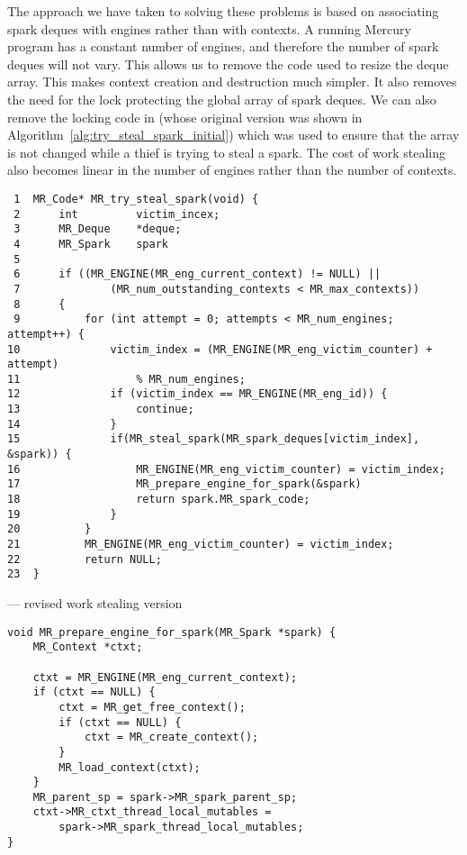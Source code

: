 The approach we have taken to solving these problems is based on associating
spark deques with engines rather than with contexts.
A running Mercury program has a constant number of engines,
and therefore the number of spark deques will not vary.
This allows us to remove the code used to resize the deque array.
This makes context creation and destruction much simpler.
It also removes the need for the lock protecting the global array of spark
deques.
We can also remove the locking code in \trystealspark
(whose original version was shown in
Algorithm~\ref{alg:try_steal_spark_initial})
which was used to
ensure that the array is not changed while a thief is trying to steal a
spark.
The cost of work stealing also becomes linear in the number of engines
rather than the number of contexts.

\begin{algorithm}[tbp]
\begin{verbatim}
 1  MR_Code* MR_try_steal_spark(void) {
 2      int         victim_incex;
 3      MR_Deque    *deque;
 4      MR_Spark    spark
 5
 6      if ((MR_ENGINE(MR_eng_current_context) != NULL) ||
 7              (MR_num_outstanding_contexts < MR_max_contexts))
 8      {
 9          for (int attempt = 0; attempts < MR_num_engines; attempt++) {
10              victim_index = (MR_ENGINE(MR_eng_victim_counter) + attempt)
11                  % MR_num_engines;
12              if (victim_index == MR_ENGINE(MR_eng_id)) {
13                  continue;
14              }
15              if(MR_steal_spark(MR_spark_deques[victim_index], &spark)) {
16                  MR_ENGINE(MR_eng_victim_counter) = victim_index;
17                  MR_prepare_engine_for_spark(&spark)
18                  return spark.MR_spark_code;
19              }
20          }
21          MR_ENGINE(MR_eng_victim_counter) = victim_index;
22          return NULL;
23  }
\end{verbatim}
\caption{\trystealspark --- revised work stealing version}
\label{alg:try_steal_spark_revised}
\end{algorithm}

\begin{algorithm}[tbp]
\begin{verbatim}
void MR_prepare_engine_for_spark(MR_Spark *spark) {
    MR_Context *ctxt;

    ctxt = MR_ENGINE(MR_eng_current_context);
    if (ctxt == NULL) {
        ctxt = MR_get_free_context();
        if (ctxt == NULL) {
            ctxt = MR_create_context();
        }
        MR_load_context(ctxt);
    }
    MR_parent_sp = spark->MR_spark_parent_sp;
    ctxt->MR_ctxt_thread_local_mutables =
        spark->MR_spark_thread_local_mutables;
}
\end{verbatim}
\caption{\prepareengineforspark}
\label{alg:prepare_engine_for_spark}
\end{algorithm}

